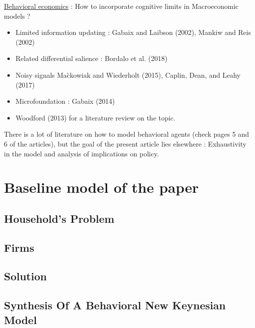 \documentclass{beamer}
\newcommand\ReduceFont{\fontsize{10}{7.2}\selectfont}
\begin{document}
\begin{frame}{\subsecname}
    \underline{Behavioral economics} : How to incorporate cognitive limits in Macroeconomic models ?
    \begin{itemize}
        \item Limited information updating : Gabaix and Laibson (2002), Mankiw and Reis (2002)
        \item Related differential salience : Bordalo et al. (2018)
        \item Noisy signals Ma\`ckowiak and Wiederholt (2015), Caplin, Dean, and Leahy (2017)
        \item Microfoundation : Gabaix (2014)
        \item Woodford (2013) for a literature review on the topic.
    \end{itemize}
    There is a lot of literature on how to model behavioral agents (check pages 5 and 6 of the articles), but the goal of the present article lies elsewhere : Exhaustivity in the model and analysis of implications on policy.
\end{frame}

\section{Baseline model of the paper}
\begin{frame}
    \ReduceFont
\end{frame}

\begin{frame}
    \tableofcontents[currentsection, hideothersubsections, sections=\value{section}]
\end{frame}

\subsection{Household's Problem}

\subsection{Firms}

\subsection{Solution}

\subsection{Synthesis Of A Behavioral New Keynesian Model}
\end{document}
